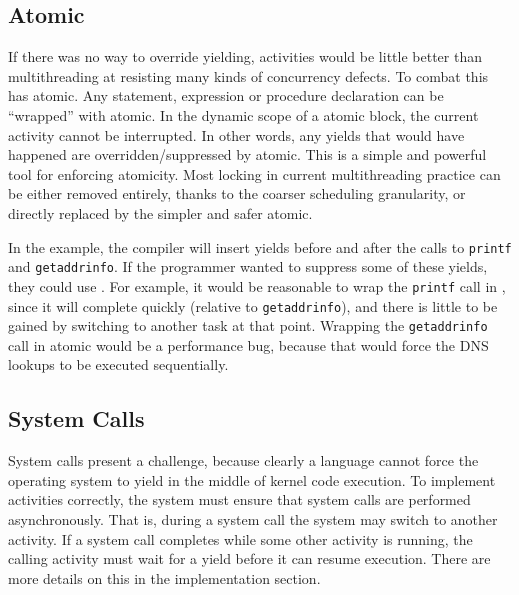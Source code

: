 \documentclass[preprint, 10pt, numbers]{sigplanconf}
\begin{document}
\subsection{Atomic}
\label{sec:atomic}

If there was no way to override yielding, activities would be little better than multithreading at resisting many kinds of concurrency defects.
To combat this \charcoal{} has atomic.
Any statement, expression or procedure declaration can be ``wrapped'' with atomic.
In the dynamic scope of a atomic block, the current activity cannot be interrupted.
In other words, any yields that would have happened are overridden/suppressed by atomic.
This is a simple and powerful tool for enforcing atomicity.
Most locking in current multithreading practice can be either removed entirely, thanks to the coarser scheduling granularity, or directly replaced by the simpler and safer atomic.

In the example, the compiler will insert yields before and after the calls to \texttt{printf} and \texttt{getaddrinfo}.
If the programmer wanted to suppress some of these yields, they could use \atomic{}.
For example, it would be reasonable to wrap the \texttt{printf} call in \atomic{}, since it will complete quickly (relative to \texttt{getaddrinfo}), and there is little to be gained by switching to another task at that point.
Wrapping the \texttt{getaddrinfo} call in atomic would be a performance bug, because that would force the DNS lookups to be executed sequentially.

\subsection{System Calls}

System calls present a challenge, because clearly a language cannot force the operating system to yield in the middle of kernel code execution.
To implement activities correctly, the system must ensure that system calls are performed asynchronously.
That is, during a system call the system may switch to another activity.
If a system call completes while some other activity is running, the calling activity must wait for a yield before it can resume execution.
There are more details on this in the implementation section.

\end{document}
